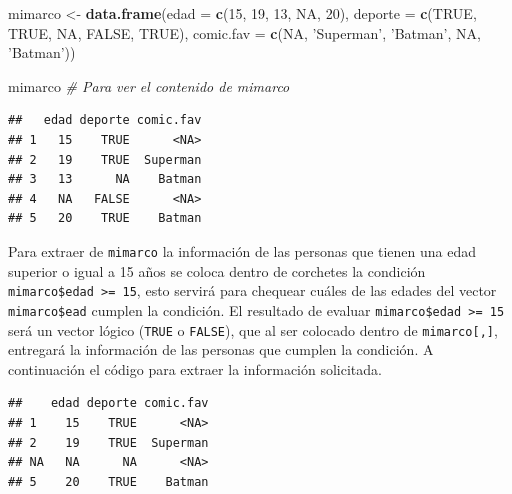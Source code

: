 \documentclass[10pt,]{krantz}
\makeatletter
\newenvironment{Shaded}{\begin{snugshade}}{\end{snugshade}}
\newcommand{\KeywordTok}[1]{\textcolor[rgb]{0.13,0.29,0.53}{\textbf{#1}}}
\newcommand{\DataTypeTok}[1]{\textcolor[rgb]{0.13,0.29,0.53}{#1}}
\newcommand{\DecValTok}[1]{\textcolor[rgb]{0.00,0.00,0.81}{#1}}
\newcommand{\StringTok}[1]{\textcolor[rgb]{0.31,0.60,0.02}{#1}}
\newcommand{\CommentTok}[1]{\textcolor[rgb]{0.56,0.35,0.01}{\textit{#1}}}
\newcommand{\OtherTok}[1]{\textcolor[rgb]{0.56,0.35,0.01}{#1}}
\newcommand{\OperatorTok}[1]{\textcolor[rgb]{0.81,0.36,0.00}{\textbf{#1}}}
\newcommand{\NormalTok}[1]{#1}
\newenvironment{kframe}{%
\medskip{}
\setlength{\fboxsep}{.8em}
 \def\at@end@of@kframe{}%
 \ifinner\ifhmode%
  \def\at@end@of@kframe{\end{minipage}}%
  \begin{minipage}{\columnwidth}%
 \fi\fi%
 \def\FrameCommand##1{\hskip\@totalleftmargin \hskip-\fboxsep
 \colorbox{shadecolor}{##1}\hskip-\fboxsep
     \hskip-\linewidth \hskip-\@totalleftmargin \hskip\columnwidth}%
 \MakeFramed {\advance\hsize-\width
   \@totalleftmargin\z@ \linewidth\hsize
   \@setminipage}}%
 {\par\unskip\endMakeFramed%
 \at@end@of@kframe}
\renewenvironment{Shaded}{\begin{kframe}}{\end{kframe}}
\makeatother
\begin{document}
\begin{Shaded}
\begin{Highlighting}[]
\NormalTok{mimarco <-}\StringTok{ }\KeywordTok{data.frame}\NormalTok{(}\DataTypeTok{edad =} \KeywordTok{c}\NormalTok{(}\DecValTok{15}\NormalTok{, }\DecValTok{19}\NormalTok{, }\DecValTok{13}\NormalTok{, }\OtherTok{NA}\NormalTok{, }\DecValTok{20}\NormalTok{), }
                      \DataTypeTok{deporte =} \KeywordTok{c}\NormalTok{(}\OtherTok{TRUE}\NormalTok{, }\OtherTok{TRUE}\NormalTok{, }\OtherTok{NA}\NormalTok{, }\OtherTok{FALSE}\NormalTok{, }\OtherTok{TRUE}\NormalTok{),}
                      \DataTypeTok{comic.fav =} \KeywordTok{c}\NormalTok{(}\OtherTok{NA}\NormalTok{, }\StringTok{'Superman'}\NormalTok{, }\StringTok{'Batman'}\NormalTok{,}
                                    \OtherTok{NA}\NormalTok{, }\StringTok{'Batman'}\NormalTok{))}

\NormalTok{mimarco  }\CommentTok{# Para ver el contenido de mimarco}
\end{Highlighting}
\end{Shaded}

\begin{verbatim}
##   edad deporte comic.fav
## 1   15    TRUE      <NA>
## 2   19    TRUE  Superman
## 3   13      NA    Batman
## 4   NA   FALSE      <NA>
## 5   20    TRUE    Batman
\end{verbatim}

Para extraer de \texttt{mimarco} la información de las personas que
tienen una edad superior o igual a 15 años se coloca dentro de corchetes
la condición \texttt{mimarco\$edad\ \textgreater{}=\ 15}, esto servirá
para chequear cuáles de las edades del vector \texttt{mimarco\$ead}
cumplen la condición. El resultado de evaluar
\texttt{mimarco\$edad\ \textgreater{}=\ 15} será un vector lógico
(\texttt{TRUE} o \texttt{FALSE}), que al ser colocado dentro de
\texttt{mimarco{[},{]}}, entregará la información de las personas que
cumplen la condición. A continuación el código para extraer la
información solicitada.

\begin{Shaded}
\end{Shaded}

\begin{verbatim}
##    edad deporte comic.fav
## 1    15    TRUE      <NA>
## 2    19    TRUE  Superman
## NA   NA      NA      <NA>
## 5    20    TRUE    Batman
\end{verbatim}
\end{document}
